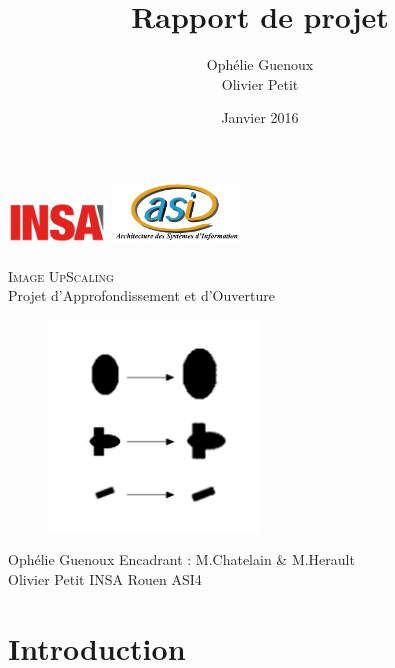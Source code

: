 \documentclass[12pt, a4paper]{article}
\title{Rapport de projet}
\author{Ophélie Guenoux \\Olivier Petit}
\date{Janvier 2016}
\begin{document}
\makeatletter
\begin{titlepage}
  \begin{center}
      \includegraphics[width=0.20\textwidth]{Images/Logo_INSA.png}
      \hfill
      \includegraphics[width=0.25\textwidth]{Images/logoasi.png}\\
    \vspace{1cm}
		\Huge \underline{\@title} 
			\\ \textsc{Image UpScaling}
			\\ \Large Projet d'Approfondissement et d'Ouverture
			\vspace{1cm}
			\begin{figure}[h!]
				\centering
				\includegraphics[width=0.5\textwidth]{Images/page-de-garde.png}
			\end{figure}
	\vspace{4cm}
	\end{center}
	\raggedright
	\large Ophélie Guenoux \hfill Encadrant : M.Chatelain \& M.Herault
	\\Olivier Petit \hfill INSA Rouen ASI4
	
\end{titlepage}

\newpage
\tableofcontents
\newpage

\vspace*{5cm}

\section*{Introduction}
\end{document}
